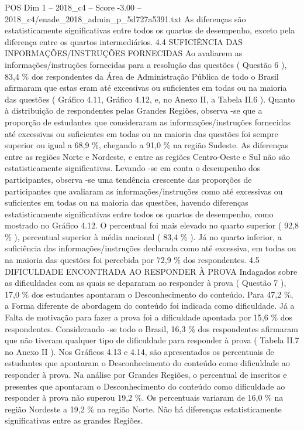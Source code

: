 \begin{textsample}{POS Dim 1 – 2018\_c4 – Score -3.00 – 2018\_c4/enade\_2018\_admin\_p\_5d727a5391.txt}
As diferenças são estatisticamente significativas entre todos os quartos de desempenho, exceto pela diferença entre os quartos intermediários. 4.4 SUFICIÊNCIA DAS INFORMAÇÕES/INSTRUÇÕES FORNECIDAS Ao avaliarem as informações/instruções fornecidas para a resolução das questões ( Questão 6 ), 83,4 \% dos respondentes da Área de Administração Pública de todo o Brasil afirmaram que estas eram até excessivas ou suficientes em todas ou na maioria das questões ( Gráfico 4.11, Gráfico 4.12, e, no Anexo II, a Tabela II.6 ).
Quanto à distribuição de respondentes pelas Grandes Regiões, observa -se que a proporção de estudantes que consideraram as informações/instruções fornecidas até excessivas ou suficientes em todas ou na maioria das questões foi sempre superior ou igual a 68,9 \%, chegando a 91,0 \% na região Sudeste.
As diferenças entre as regiões Norte e Nordeste, e entre as regiões Centro-Oeste e Sul não são estatisticamente significativas.
Levando -se em conta o desempenho dos participantes, observa -se uma tendência crescente das proporções de participantes que avaliaram as informações/instruções como até excessivas ou suficientes em todas ou na maioria das questões, havendo diferenças estatisticamente significativas entre todos os quartos de desempenho, como mostrado no Gráfico 4.12.
O percentual foi mais elevado no quarto superior ( 92,8 \% ), percentual superior à média nacional ( 83,4 \% ).
Já no quarto inferior, a suficiência das informações/instruções declarada como até excessiva, em todas ou na maioria das questões foi percebida por 72,9 \% dos respondentes. 4.5 DIFICULDADE ENCONTRADA AO RESPONDER À PROVA Indagados sobre as dificuldades com as quais se depararam ao responder à prova ( Questão 7 ), 17,0 \% dos estudantes apontaram o Desconhecimento do conteúdo.
Para 47,2 \%, a Forma diferente de abordagem do conteúdo foi indicada como dificuldade.
Já a Falta de motivação para fazer a prova foi a dificuldade apontada por 15,6 \% dos respondentes.
Considerando -se todo o Brasil, 16,3 \% dos respondentes afirmaram que não tiveram qualquer tipo de dificuldade para responder à prova ( Tabela II.7 no Anexo II ).
Nos Gráficos 4.13 e 4.14, são apresentados os percentuais de estudantes que apontaram o Desconhecimento do conteúdo como dificuldade ao responder à prova.
Na análise por Grandes Regiões, o percentual de inscritos e presentes que apontaram o Desconhecimento do conteúdo como dificuldade ao responder à prova não superou 19,2 \%.
Os percentuais variaram de 16,0 \% na região Nordeste a 19,2 \% na região Norte.
Não há diferenças estatisticamente significativas entre as grandes Regiões.

\end{textsample}
